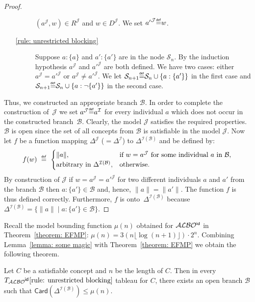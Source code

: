 \documentclass[leqno
,pdflatex
,prodmode
,acmtocl
]{acmsmall}
\makeatletter
\newcommand{\mathcmd}[1]{\ensuremath{#1}\xspace}
\newcommand{\dlfont}{\mathcal}
\newcommand{\dl}[1]{\mathcmd{\dlfont{#1}}}
\newcommand{\idRole}{\mathcmd{\textsf{\upshape\mdseries id}}}
\newcommand{\ALBOid}{\dl{ALBO\smash[t]{\mbox{${}^{\idRole}$}}}}
\def\Not{\neg}
\newcommand{\metasmbfont}{\mathsf}
\newcommand{\Card}{\mathcmd{\metasmbfont{Card}}}
\def\@define#1{\mathcmd{\stackrel {\mbox{\tiny\ensuremath{\metasmbfont{def}}}}{{#1}}}}
\def\sm@shdefine#1{\smash[t]{\@define{#1}}}
\newcommand{\define}{\mathchoice{\@define{\ =\ }}{\sm@shdefine{=}}{\sm@shdefine{=}}{\sm@shdefine{=}}}
\newcommand{\ecl}[1]{\|#1\|}
\newcommand{\branch}[1]{\seg{#1}}
\newcommand{\seg}[1]{\mathcmd{\mathcal{#1}}}
\newcommand{\indiv}{a}
\newcommand{\I}{\mathcal{I}}
\newcommand{\J}{\mathcal{J}}
\newcommand{\TALBOidub}{\mathcmd{T_\ALBOid\eqref{rule: unrestricted blocking}}}
\newcommand{\IB}{{\I(\branch{B})}}
\makeatother
\begin{document}
\begin{proof}
\begin{itemize}
\begin{description}
              $(\indiv^\J,w)\in R^\J$ and $w\in D^\J$.
              We set ${\indiv'}^\J\define w$.
        \item[\eqref{rule: unrestricted blocking}]
              Suppose $\indiv:\{\indiv\}$ and $\indiv':\{\indiv'\}$ are in the node $\seg{S}_n$.
              By the induction hypothesis $\indiv^{\J}$ and ${\indiv'}^{\J}$ are both defined.
              We have two cases: either $\indiv^{\J}={\indiv'}^{\J}$ or $\indiv^\J\neq {\indiv'}^{\J}$.
              We let $\seg{S}_{n+1}\define\seg{S}_n\cup\{\indiv:\{\indiv'\}\}$ in the first case and
                $\seg{S}_{n+1}\define\seg{S}_n\cup\{\indiv:\Not\{\indiv'\}\}$ in the second case.
       \end{description}
\end{itemize}
Thus, we constructed an appropriate branch $\branch{B}$.
In order to complete the construction of~$\J$ we set 
$\indiv^\J\define\indiv^\I$ for every individual $\indiv$
which does not occur in the constructed branch~$\branch{B}$.
Clearly, the model $\J$ satisfies the required properties.
$\branch{B}$ is open since  the set of all concepts from $\branch{B}$ is satisfiable in the model $\J$.
Now let $f$ be a function mapping $\Delta^{\J}$ ($=\Delta^\I$) to $\Delta^\IB$
and be defined by:
\[
f(w)\define \begin{cases}
  \ecl{\indiv}, &\text{if $w=\indiv^{\J}$ for some individual $\indiv$ in $\branch{B}$},\\
  \text{arbitrary in $\Delta^\IB$}, & \text{otherwise}.
 \end{cases}
\]
By construction of $\J$
if $w=\indiv^{\J}={\indiv'}^{\J}$ for two different individuals $\indiv$ and $\indiv'$ 
from the branch $\branch{B}$
then $\indiv:\{\indiv'\}\in\branch{B}$ and, hence,
$\ecl{\indiv}=\ecl{\indiv'}$.
The function $f$ is thus defined correctly.
Furthermore, $f$ is onto~$\Delta^\IB$ because 
$\Delta^\IB=\{\ecl{\indiv}\mid \indiv:\{\indiv'\}\in\branch{B}\}$.
\end{proof}

Recall the model bounding function $\mu(n)$ obtained 
for $\ALBOid$ in Theorem~\ref{theorem: EFMP}: $\mu(n)=3(n\lfloor\log(n+1)\rfloor)\cdot 2^n$.
Combining Lemma~\ref{lemma: some magic} with Theorem~\ref{theorem: EFMP} we obtain the following theorem.
\begin{theorem}\label{theorem: finite branch existence}
Let $C$ be a satisfiable concept and $n$ be the length of $C$. Then
in every $\TALBOidub$ tableau for $C$,
there exists an open branch $\branch{B}$
such that $\Card(\Delta^\IB)\leq\mu(n)$.
\end{theorem}
\end{document}
